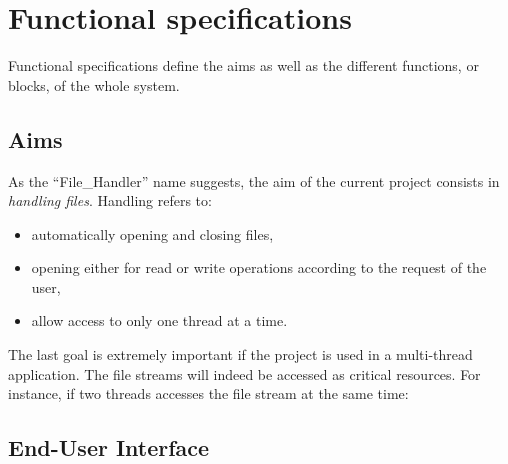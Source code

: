 \chapter{Functional specifications}

Functional specifications define the aims as well as the different functions, or blocks, of the whole system.


\section{Aims}

 	As the \enquote{File\_Handler} name suggests, the aim of the current project consists in \emph{handling files}.
 	Handling refers to:
 	\begin{itemize}
 		\item automatically opening and closing files,
 		\item opening either for read or write operations according to the request of the user,
 		\item allow access to only one thread at a time.
 	\end{itemize}
 
 	The last goal is extremely important if the project is used in a multi-thread application.
 	The file streams will indeed be accessed as critical resources.
 	For instance, if two threads accesses the file stream at the same time:
 	
 	
 
 
\section{End-User Interface}

	